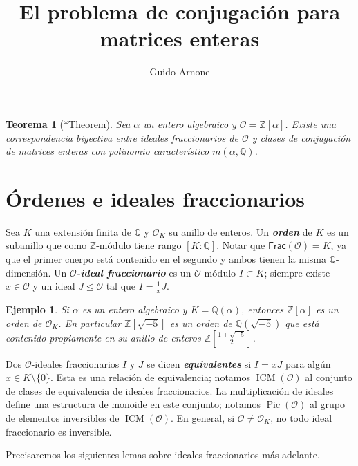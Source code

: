 \documentclass[11pt,a4paper]{amsart}
\title[El problema de conjugación para matrices enteras]{El problema
de conjugación para matrices enteras}
\author{Guido Arnone}
\date{}
\newcommand{\Q}{\mathbb{Q}}
\newcommand{\Z}{\mathbb{Z}}
\renewcommand{\emph}[1]{\textbf{\textit{#1}}}
\DeclareMathOperator{\Pic}{Pic}
\DeclareMathOperator{\ICM}{ICM}
\theoremstyle{plain}
\newtheorem{ej}{Ejemplo}
\newtheorem{thm}[equation]{Teorema}
\renewcommand{\O}{\mathcal{O}}
\begin{document}
\maketitle

\begin{tcolorbox}[colback=thmcol!30, sharp corners, colframe=white]
\begin{thm}[\cite{lm}*{Theorem}]\label{thm:main} Sea $\alpha$
un entero algebraico y $\mathcal O = \Z[\alpha]$. Existe una correspondencia
biyectiva entre ideales fraccionarios de $\mathcal O$ y clases de
conjugación de matrices enteras con polinomio característico $m(\alpha, \Q)$.
\end{thm}
\end{tcolorbox}

\section{Órdenes e ideales fraccionarios}

Sea $K$ una extensión finita de $\Q$ y $\O_K$ su anillo de enteros. Un
\emph{orden} de $K$ es un subanillo que como $\Z$-módulo tiene
rango $[K:\Q]$. Notar que $\mathsf{Frac}(\mathcal O) = K$, ya que el primer
cuerpo está contenido en el segundo y ambos tienen la misma
$\Q$-dimensión. Un \emph{$\mathcal O$-ideal fraccionario} es
un $\mathcal O$-módulo $I \subset K$; siempre existe $x \in \mathcal O$
y un ideal $J \trianglelefteq \mathcal O$ tal que $I = \frac{1}{x} J$.
\begin{ej} Si $\alpha$ es un entero algebraico y $K=\Q(\alpha)$,
entonces $\Z[\alpha]$ es un orden de $\O_K$. En particular
$\Z[\sqrt{-5}]$ es un orden de $\Q(\sqrt{-5})$ que está contenido
propiamente en su anillo de enteros $\Z[\frac{1+\sqrt{-5}}{2}]$.
\end{ej}
Dos $\mathcal O$-ideales fraccionarios $I$ y $J$ se dicen \emph{equivalentes}
si $I = xJ$ para algún $x \in K \setminus \{0\}$. Esta es una relación
de equivalencia; notamos $\ICM(\mathcal O)$ al conjunto de clases de
equivalencia de ideales fraccionarios. La multiplicación de ideales define
una estructura de monoide en este conjunto; notamos $\Pic(\O)$
al grupo de elementos inversibles de $\ICM(\O)$. En general,
si $\mathcal O \ne \mathcal O_K$, no todo
ideal fraccionario es inversible.

Precisaremos los siguientes lemas sobre ideales fraccionarios
más adelante.
\end{document}
